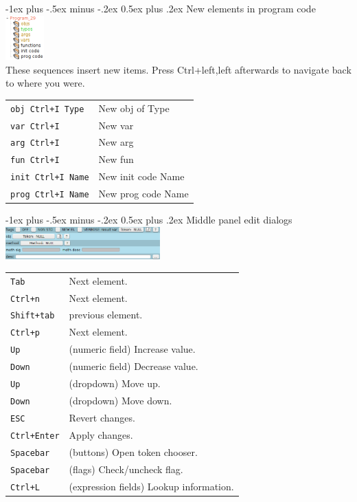 \documentclass[10pt,landscape]{article}
\makeatletter
\renewcommand{\section}{\@startsection{section}{1}{0mm}%
                                {-1ex plus -.5ex minus -.2ex}%
                                {0.5ex plus .2ex}%
                                {\normalfont\large\bfseries}}
\makeatother
\begin{document}
\begin{multicols}{3}
\section{New elements in program code}
\includegraphics[width=56px]{programcode.png} \\
These sequences insert new items. Press Ctrl+left,left afterwards to navigate back to where you were. \\
\begin{tabular}{@{}ll@{}}
\verb!obj Ctrl+I Type!    & New obj of Type \\
\verb!var Ctrl+I!    & New var \\
\verb!arg Ctrl+I!    & New arg \\
\verb!fun Ctrl+I!    & New fun \\
\verb!init Ctrl+I Name!    & New init code Name \\
\verb!prog Ctrl+I Name!    & New prog code Name \\
\end{tabular}

\section{Middle panel edit dialogs}
\includegraphics[width=225px]{middlepanel.png} \\
\begin{tabular}{@{}ll@{}} \\
\verb!Tab!    & Next element. \\
\verb!Ctrl+n!    & Next element. \\
\verb!Shift+tab!    & previous element. \\
\verb!Ctrl+p!    & Next element. \\
\verb!Up!    & (numeric field) Increase value. \\
\verb!Down!    & (numeric field) Decrease value. \\
\verb!Up!    & (dropdown) Move up. \\
\verb!Down!    & (dropdown) Move down. \\
\verb!ESC!    & Revert changes. \\
\verb!Ctrl+Enter!    & Apply changes. \\
\verb!Spacebar!    & (buttons) Open token chooser. \\
\verb!Spacebar!    & (flags) Check/uncheck flag. \\
\verb!Ctrl+L!    & (expression fields) Lookup information. \\
\end{tabular}


\end{multicols}
\end{document}
